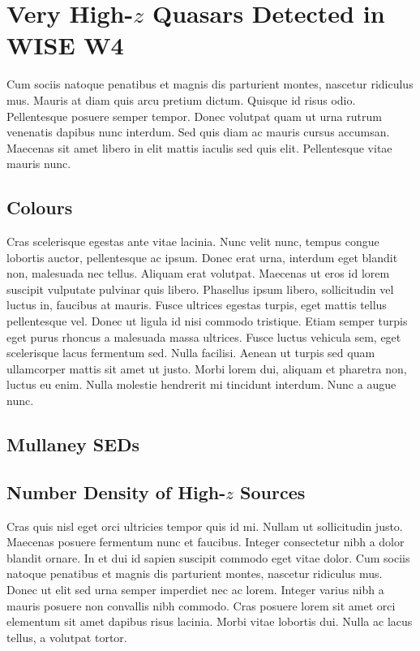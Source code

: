 \documentclass[usenatbib]{mnras}
\begin{document}
\section{Very High-$z$ Quasars Detected in WISE W4}
Cum sociis natoque penatibus et magnis dis parturient montes, nascetur
ridiculus mus. Mauris at diam quis arcu pretium dictum. Quisque id
risus odio. Pellentesque posuere semper tempor. Donec volutpat quam ut
urna rutrum venenatis dapibus nunc interdum. Sed quis diam ac mauris
cursus accumsan. Maecenas sit amet libero in elit mattis iaculis sed
quis elit. Pellentesque vitae mauris nunc.

\subsection{Colours}
Cras scelerisque egestas ante vitae lacinia. Nunc velit nunc, tempus
congue lobortis auctor, pellentesque ac ipsum. Donec erat urna,
interdum eget blandit non, malesuada nec tellus. Aliquam erat
volutpat. Maecenas ut eros id lorem suscipit vulputate pulvinar quis
libero. Phasellus ipsum libero, sollicitudin vel luctus in, faucibus
at mauris. Fusce ultrices egestas turpis, eget mattis tellus
pellentesque vel. Donec ut ligula id nisi commodo tristique. Etiam
semper turpis eget purus rhoncus a malesuada massa ultrices. Fusce
luctus vehicula sem, eget scelerisque lacus fermentum sed. Nulla
facilisi. Aenean ut turpis sed quam ullamcorper mattis sit amet ut
justo. Morbi lorem dui, aliquam et pharetra non, luctus eu enim. Nulla
molestie hendrerit mi tincidunt interdum. Nunc a augue nunc.

\subsection{Mullaney SEDs}

\subsection{Number Density of High-$z$ Sources}
Cras quis nisl eget orci ultricies tempor quis id mi. Nullam ut
sollicitudin justo. Maecenas posuere fermentum nunc et
faucibus. Integer consectetur nibh a dolor blandit ornare. In et dui
id sapien suscipit commodo eget vitae dolor. Cum sociis natoque
penatibus et magnis dis parturient montes, nascetur ridiculus
mus. Donec ut elit sed urna semper imperdiet nec ac lorem. Integer
varius nibh a mauris posuere non convallis nibh commodo. Cras posuere
lorem sit amet orci elementum sit amet dapibus risus lacinia. Morbi
vitae lobortis dui. Nulla ac lacus tellus, a volutpat tortor.
\end{document}

